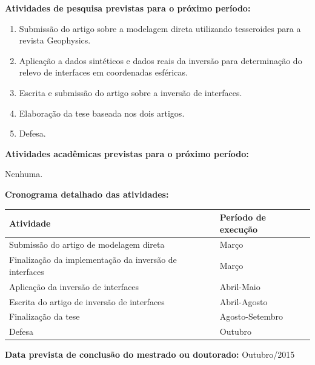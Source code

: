 \documentclass[12pt,a4paper]{article}
\begin{document}
\begin{flushleft}

\textbf{Atividades de pesquisa previstas para o próximo período:}

\begin{enumerate}
    \item Submissão do artigo sobre a modelagem direta utilizando
        tesseroides para a revista Geophysics.
    \item Aplicação a dados sintéticos e dados reais da inversão para
        determinação do relevo de interfaces em coordenadas esféricas.
    \item Escrita e submissão do artigo sobre a inversão de interfaces.
    \item Elaboração da tese baseada nos dois artigos.
    \item Defesa.
\end{enumerate}

\textbf{Atividades acadêmicas previstas para o próximo período:}

\bigskip

Nenhuma.

\bigskip

\textbf{Cronograma detalhado das atividades:}

\begin{center}
\begin{tabular}{l|l}
    \toprule
    \textbf{Atividade} & \textbf{Período de execução} \\
    \midrule
    Submissão do artigo de modelagem direta & Março\\
    Finalização da implementação da inversão de interfaces & Março\\
    Aplicação da inversão de interfaces & Abril-Maio\\
    Escrita do artigo de inversão de interfaces & Abril-Agosto\\
    Finalização da tese & Agosto-Setembro\\
    Defesa & Outubro\\
    \bottomrule
\end{tabular}
\end{center}


\bigskip

\textbf{Data prevista de conclusão do mestrado ou doutorado:} Outubro/2015

\end{flushleft}
\end{document}
